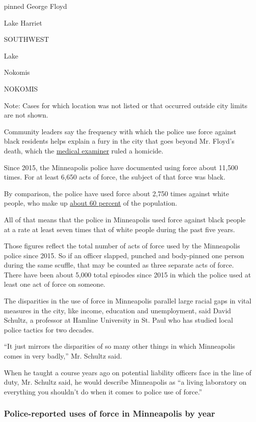 pinned George Floyd

Lake Harriet

SOUTHWEST

Lake

Nokomis

NOKOMIS

Note: Cases for which location was not listed or that occurred outside
city limits are not shown.

Community leaders say the frequency with which the police use force
against black residents helps explain a fury in the city that goes
beyond Mr. Floyd's death, which the
\href{https://www.nytimes3xbfgragh.onion/article/george-floyd-autopsy-michael-baden.html}{medical
examiner} ruled a homicide.

Since 2015, the Minneapolis police have documented using force about
11,500 times. For at least 6,650 acts of force, the subject of that
force was black.

By comparison, the police have used force about 2,750 times against
white people, who make up
\href{https://www.census.gov/quickfacts/minneapoliscityminnesota}{about
60 percent} of the population.

All of that means that the police in Minneapolis used force against
black people at a rate at least seven times that of white people during
the past five years.

Those figures reflect the total number of acts of force used by the
Minneapolis police since 2015. So if an officer slapped, punched and
body-pinned one person during the same scuffle, that may be counted as
three separate acts of force. There have been about 5,000 total episodes
since 2015 in which the police used at least one act of force on
someone.

The disparities in the use of force in Minneapolis parallel large racial
gaps in vital measures in the city, like income, education and
unemployment, said David Schultz, a professor at Hamline University in
St. Paul who has studied local police tactics for two decades.

``It just mirrors the disparities of so many other things in which
Minneapolis comes in very badly,'' Mr. Schultz said.

When he taught a course years ago on potential liability officers face
in the line of duty, Mr. Schultz said, he would describe Minneapolis as
``a living laboratory on everything you shouldn't do when it comes to
police use of force.''

\hypertarget{police-reported-uses-of-force-in-minneapolis-by-year}{%
\subsubsection{Police-reported uses of force in Minneapolis by
year}\label{police-reported-uses-of-force-in-minneapolis-by-year}}

